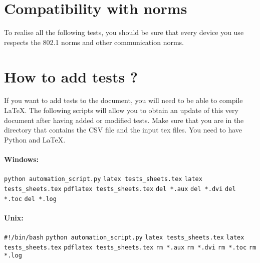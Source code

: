 \documentclass[oneside]{book}
\begin{document}
\section{Compatibility with norms}
To realise all the following tests, you should be sure that every device you use respects the 802.1 norms and other communication norms. 
\section{How to add tests ?}
If you want to add tests to the document, you will need to be able to compile LaTeX. 
\newline
The following scripts will allow you to obtain an update of this very document after having added or modified tests. Make sure that you are in the directory that contains the CSV file and the input tex files. You need to have Python and LaTeX.

\paragraph{Windows: }
\verb|python automation_script.py| 
\newline
\verb|latex tests_sheets.tex|
\newline
\verb|latex tests_sheets.tex|
\newline
\verb|pdflatex tests_sheets.tex|
\newline
\verb|del *.aux|
\newline
\verb|del *.dvi|
\newline
\verb|del *.toc|
\newline
\verb|del *.log|
\paragraph{Unix: }
\verb|#!/bin/bash|
\newline
\verb|python automation_script.py| 
\newline
\verb|latex tests_sheets.tex|
\newline
\verb|latex tests_sheets.tex|
\newline
\verb|pdflatex tests_sheets.tex|
\newline
\verb|rm *.aux|
\newline
\verb|rm *.dvi|
\newline
\verb|rm *.toc|
\newline
\verb|rm *.log|
\end{document}
